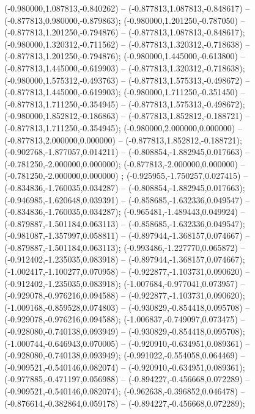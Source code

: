  (-0.980000,1.087813,-0.840262) -- (-0.877813,1.087813,-0.848617) -- (-0.877813,0.980000,-0.879863);
 (-0.980000,1.201250,-0.787050) -- (-0.877813,1.201250,-0.794876) -- (-0.877813,1.087813,-0.848617);
 (-0.980000,1.320312,-0.711562) -- (-0.877813,1.320312,-0.718638) -- (-0.877813,1.201250,-0.794876);
 (-0.980000,1.445000,-0.613800) -- (-0.877813,1.445000,-0.619903) -- (-0.877813,1.320312,-0.718638);
 (-0.980000,1.575312,-0.493763) -- (-0.877813,1.575313,-0.498672) -- (-0.877813,1.445000,-0.619903);
 (-0.980000,1.711250,-0.351450) -- (-0.877813,1.711250,-0.354945) -- (-0.877813,1.575313,-0.498672);
 (-0.980000,1.852812,-0.186863) -- (-0.877813,1.852812,-0.188721) -- (-0.877813,1.711250,-0.354945);
 (-0.980000,2.000000,0.000000) -- (-0.877813,2.000000,0.000000) -- (-0.877813,1.852812,-0.188721);
 (-0.902768,-1.877057,0.014211) -- (-0.808854,-1.882945,0.017663) -- (-0.781250,-2.000000,0.000000);
 (-0.877813,-2.000000,0.000000) -- (-0.781250,-2.000000,0.000000) ;
 (-0.925955,-1.750257,0.027415) -- (-0.834836,-1.760035,0.034287) -- (-0.808854,-1.882945,0.017663);
 (-0.946985,-1.620648,0.039391) -- (-0.858685,-1.632336,0.049547) -- (-0.834836,-1.760035,0.034287);
 (-0.965481,-1.489443,0.049924) -- (-0.879887,-1.501184,0.063113) -- (-0.858685,-1.632336,0.049547);
 (-0.981087,-1.357997,0.058811) -- (-0.897944,-1.368157,0.074667) -- (-0.879887,-1.501184,0.063113);
 (-0.993486,-1.227770,0.065872) -- (-0.912402,-1.235035,0.083918) -- (-0.897944,-1.368157,0.074667);
 (-1.002417,-1.100277,0.070958) -- (-0.922877,-1.103731,0.090620) -- (-0.912402,-1.235035,0.083918);
 (-1.007684,-0.977041,0.073957) -- (-0.929078,-0.976216,0.094588) -- (-0.922877,-1.103731,0.090620);
 (-1.009168,-0.859528,0.074803) -- (-0.930829,-0.854418,0.095708) -- (-0.929078,-0.976216,0.094588);
 (-1.006837,-0.749097,0.073475) -- (-0.928080,-0.740138,0.093949) -- (-0.930829,-0.854418,0.095708);
 (-1.000744,-0.646943,0.070005) -- (-0.920910,-0.634951,0.089361) -- (-0.928080,-0.740138,0.093949);
 (-0.991022,-0.554058,0.064469) -- (-0.909521,-0.540146,0.082074) -- (-0.920910,-0.634951,0.089361);
 (-0.977885,-0.471197,0.056988) -- (-0.894227,-0.456668,0.072289) -- (-0.909521,-0.540146,0.082074);
 (-0.962638,-0.396852,0.046478) -- (-0.876614,-0.382864,0.059178) -- (-0.894227,-0.456668,0.072289);
